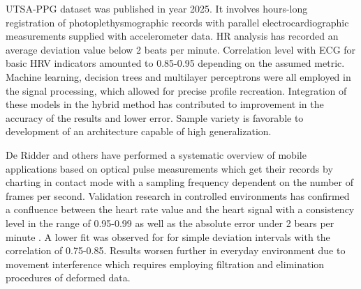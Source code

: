 \documentclass[journal]{IEEEtran}
\begin{document}
UTSA-PPG dataset \cite{18} was published in year 2025. It involves hours-long registration of photoplethysmographic records with parallel electrocardiographic measurements supplied with accelerometer data. HR analysis has recorded an average deviation value below 2 beats per minute. Correlation level with ECG for basic HRV indicators amounted to 0.85-0.95 depending on the assumed metric. Machine learning, decision trees and multilayer perceptrons were all employed in the signal processing, which allowed for precise profile recreation. Integration of these models in the hybrid method has contributed to improvement in the accuracy of the results and lower error. Sample variety is favorable to development of an architecture capable of high generalization.

\newpage
De Ridder and others \cite{19} have performed a systematic overview of mobile applications based on optical pulse measurements which get their records by charting in contact mode with a sampling frequency dependent on the number of frames per second. Validation research in controlled environments has confirmed a confluence between the heart rate value and the heart signal with a consistency level in the range of 0.95-0.99 as well as the absolute error under 2 bears per minute \cite{20}. A lower fit was observed for for simple deviation intervals with the correlation of 0.75-0.85. Results worsen further in everyday environment due to movement interference which requires employing filtration and elimination procedures of deformed data.
\end{document}
